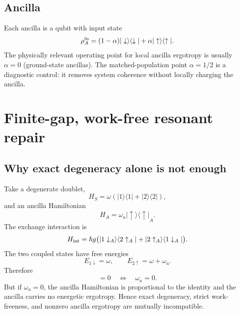 \documentclass[11pt,a4paper]{article}
\newcommand{\ket}[1]{|#1\rangle}
\newcommand{\bra}[1]{\langle #1|}
\newcommand{\proj}[1]{|#1\rangle\langle #1|}
\begin{document}
\subsection{Ancilla}

Each ancilla is a qubit with input state
\begin{equation}
\rho_A^{\rm in}=(1-\alpha)\proj{\downarrow}+\alpha\proj{\uparrow}.
\end{equation}
The physically relevant operating point for local ancilla ergotropy is usually $\alpha=0$ (ground-state ancillas). The matched-population point $\alpha=1/2$ is a diagnostic control: it removes system coherence without locally charging the ancilla.

\section{Finite-gap, work-free resonant repair}\label{sec:gap}

\subsection{Why exact degeneracy alone is not enough}

Take a degenerate doublet,
\begin{equation}
H_S=\omega(\proj{1}+\proj{2}),
\end{equation}
and an ancilla Hamiltonian
\begin{equation}
H_A=\omega_a\proj{\uparrow}_A.
\end{equation}
The exchange interaction is
\begin{equation}
H_{\rm int}=\hbar g\bigl(\ket{1\downarrow_A}\bra{2\uparrow_A}+\ket{2\uparrow_A}\bra{1\downarrow_A}\bigr).
\end{equation}
The two coupled states have free energies
\begin{equation}
E_{1\downarrow}=\omega,
\qquad
E_{2\uparrow}=\omega+\omega_a.
\end{equation}
Therefore
\begin{equation}
[H_S+H_A,H_{\rm int}]=0
\quad\Longleftrightarrow\quad
\omega_a=0.
\end{equation}
But if $\omega_a=0$, the ancilla Hamiltonian is proportional to the identity and the ancilla carries no energetic ergotropy. Hence exact degeneracy, strict work-freeness, and nonzero ancilla ergotropy are mutually incompatible.
\end{document}
